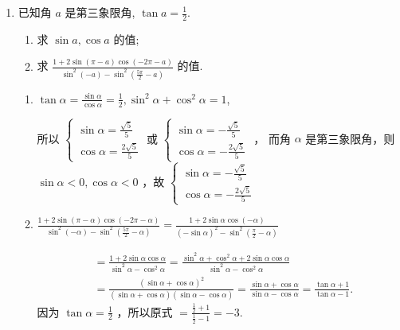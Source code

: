 \begin{enumerate}
\item 已知角 $a$ 是第三象限角, $\tan a=\frac{1}{2}$.
\begin{enumerate}
    \item 求 $\sin a, \cos a$ 的值;
    \item 求 $\frac{1+2 \sin \left(\pi-a\right) \cos \left(-2 \pi-a\right)}{\sin ^2\left(-a\right)-\sin ^2\left(\frac{5 \pi}{2}-a\right)}$ 的值.
\end{enumerate}
\begin{jieda}
\begin{enumerate}
    \item $\tan \alpha=\frac{\sin \alpha}{\cos \alpha}=\frac{1}{2}, \sin ^2 \alpha+\cos ^2 \alpha=1$,

所以 $\left\{\begin{array}{l}\sin \alpha=\frac{\sqrt{5}}{5} \\ \cos \alpha=\frac{2 \sqrt{5}}{5}\end{array}\right.$ 或 $\left\{\begin{array}{l}\sin \alpha=-\frac{\sqrt{5}}{5} \\ \cos \alpha=-\frac{2 \sqrt{5}}{5}\end{array}\right.$ ，
而角 $\alpha$ 是第三象限角，则 $\sin \alpha<0, \cos \alpha<0$ ，故 $\left\{\begin{array}{l}\sin \alpha=-\frac{\sqrt{5}}{5} \\ \cos \alpha=-\frac{2 \sqrt{5}}{5}\end{array}\right.$

\item $\frac{1+2 \sin \left(\pi-\alpha\right) \cos \left(-2 \pi-\alpha\right)}{\sin ^2\left(-\alpha\right)-\sin ^2\left(\frac{5 \pi}{2}-\alpha\right)}=\frac{1+2 \sin \alpha \cos \left(-\alpha\right)}{\left(-\sin \alpha\right)^2-\sin ^2\left(\frac{\pi}{2}-\alpha\right)}$

$$
\begin{aligned}
& =\frac{1+2 \sin \alpha \cos \alpha}{\sin ^2 \alpha-\cos ^2 \alpha}=\frac{\sin ^2 \alpha+\cos ^2 \alpha+2 \sin \alpha \cos \alpha}{\sin ^2 \alpha-\cos ^2 \alpha} \\
& =\frac{\left(\sin \alpha+\cos \alpha\right)^2}{\left(\sin \alpha+\cos \alpha\right)\left(\sin \alpha-\cos \alpha\right)}=\frac{\sin \alpha+\cos \alpha}{\sin \alpha-\cos \alpha}=\frac{\tan \alpha+1}{\tan \alpha-1} .
\end{aligned}
$$
因为 $\tan \alpha=\frac{1}{2}$ ，所以原式 $=\frac{\frac{1}{2}+1}{\frac{1}{2}-1}=-3$.
\end{enumerate}
\end{jieda}


\end{enumerate}

